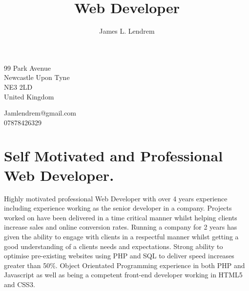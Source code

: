 \documentclass[10pt]{article}
\title{\bfseries\Huge Web Developer}
\author{James L. Lendrem}
\date{}
\begin{document}
\maketitle

\begin{minipage}[t]{0.48\textwidth}
99 Park Avenue\\
Newcastle Upon Tyne\\
NE3 2LD\\
United Kingdom
\end{minipage}
\begin{minipage}[t]{0.48\textwidth}
\begin{flushright}
Jamlendrem@gmail.com\\
07878426329
\end{flushright}
\end{minipage}

\newcommand\VRule{\color{lightgray}\vrule width 0.5pt}

\section*{Self Motivated and Professional Web Developer.}
Highly motivated professional Web Developer with over 4 years experience including experience working as the senior developer in a company. Projects worked on have been delivered in a time critical manner whilst helping clients increase sales and online conversion rates. Running a company for 2 years has given the ability to engage with clients in a respectful manner whilst getting a good understanding of a clients needs and expectations. Strong ability to optimise pre-existing websites using PHP and SQL to deliver speed increases greater than 50\%. Object Orientated Programming experience in both PHP and Javascript as well as being a competent front-end developer working in HTML5 and CSS3.
\end{document}
